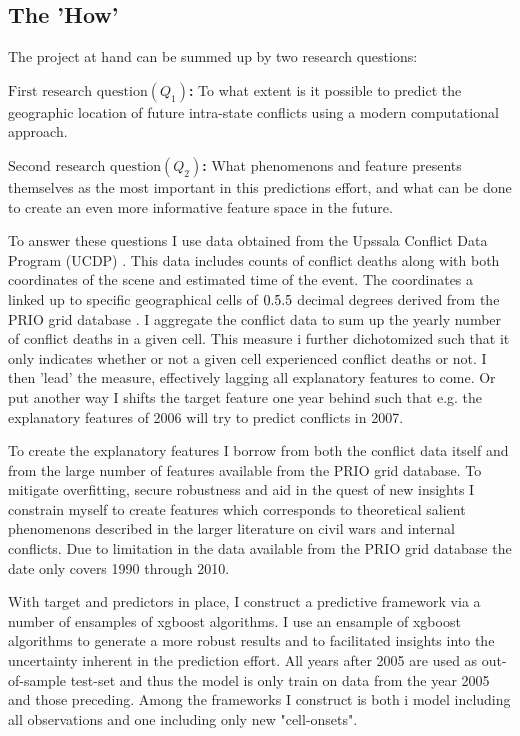 \documentclass[a4paper]{article}
\begin{document}
\subsection{The 'How'}

The project at hand can be summed up by two research questions:\par

\textbf{$\textrm{First research question} (Q_{1})$:} To what extent is it possible to predict the geographic location of future intra-state conflicts using a modern computational approach. \par
\textbf{$\textrm{Second research question} (Q_{2})$:} What phenomenons and feature presents themselves as the most important in this predictions effort, and what can be done to create an even more informative feature space in the future.\par

To answer these questions I use data obtained from the Upssala Conflict Data Program (UCDP) \citep{Sundberg_2013, Croicu_Sundberg_2017}. This data includes counts of conflict deaths along with both coordinates of the scene and estimated time of the event. The coordinates a linked up to specific geographical cells of $0.5\time0.5$ decimal degrees derived from the PRIO grid database \citep{Tollefsen_2012}. I aggregate the conflict data to sum up the yearly number of conflict deaths in a given cell. This measure i further dichotomized such that it only indicates whether or not a given cell experienced conflict deaths or not. I then 'lead' the measure, effectively lagging all explanatory features to come. Or put another way I shifts the target feature one year behind such that e.g. the explanatory features of 2006 will try to predict conflicts in 2007.\par

To create the explanatory features I borrow from both the conflict data itself and from the large number of features available from the PRIO grid database. To mitigate overfitting, secure robustness and aid in the quest of new insights I constrain myself to create features which corresponds to theoretical salient phenomenons described in the larger literature on civil wars and internal conflicts. Due to limitation in the data available from the PRIO grid database the date only covers 1990 through 2010.\par

With target and predictors in place, I construct a predictive framework via a number of ensamples of xgboost algorithms. I use an ensample of xgboost algorithms to generate a more robust results and to facilitated insights into the uncertainty inherent in the prediction effort. All years after 2005 are used as out-of-sample test-set and thus the model is only train on data from the year 2005 and those preceding. Among the frameworks I construct is both i model including all observations and one including only new "cell-onsets".\par
\end{document}
